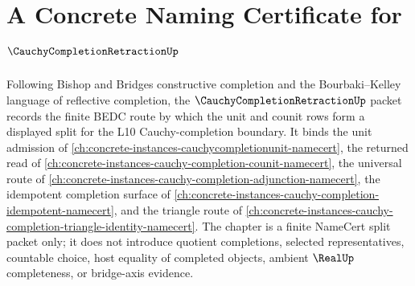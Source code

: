 \chapter{A Concrete Naming Certificate for $\CauchyCompletionRetractionUp$}
\label{ch:concrete-instances-cauchy-completion-retraction-namecert}

Following Bishop and Bridges constructive completion and the Bourbaki--Kelley language of reflective completion, the $\CauchyCompletionRetractionUp$ packet records the finite BEDC route by which the unit and counit rows form a displayed split for the L10 Cauchy-completion boundary. It binds the unit admission of \autoref{ch:concrete-instances-cauchycompletionunit-namecert}, the returned read of \autoref{ch:concrete-instances-cauchy-completion-counit-namecert}, the universal route of \autoref{ch:concrete-instances-cauchy-completion-adjunction-namecert}, the idempotent completion surface of \autoref{ch:concrete-instances-cauchy-completion-idempotent-namecert}, and the triangle route of \autoref{ch:concrete-instances-cauchy-completion-triangle-identity-namecert}. The chapter is a finite NameCert split packet only; it does not introduce quotient completions, selected representatives, countable choice, host equality of completed objects, ambient $\RealUp$ completeness, or bridge-axis evidence.

